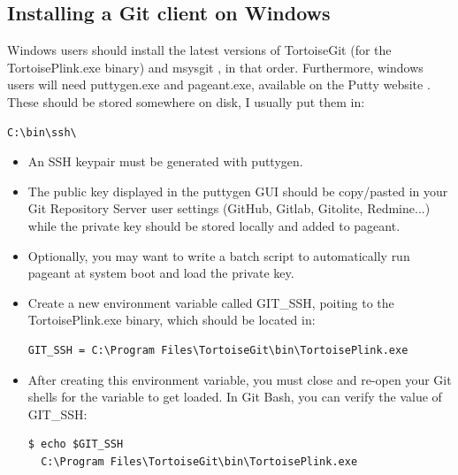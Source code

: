 \documentclass{../common/tufte-latex/tufte-handout}
\begin{document}
\subsection{Installing a Git client on Windows}\label{sec:preparation}

Windows users should install the latest versions of TortoiseGit  (for the TortoisePlink.exe binary) and msysgit , in that order.
Furthermore, windows users will need puttygen.exe and pageant.exe, available on the Putty website . These should be stored somewhere on disk, I usually put them in:

\begin{lstlisting}[style=BashInputStyle]
  C:\bin\ssh\
\end{lstlisting}

\begin{itemize}

\item{An SSH keypair must be generated with puttygen.}
\item{The public key displayed in the puttygen GUI should be copy/pasted in your Git Repository Server user settings (GitHub, Gitlab, Gitolite, Redmine...) while the private key should be stored locally and added to pageant.} 
\item{Optionally, you may want to write a batch script to automatically run pageant at system boot and load the private key.}
\item{Create a new environment variable called GIT\_SSH, poiting to the TortoisePlink.exe binary, which should be located in:}

\begin{lstlisting}[style=BashInputStyle]
  GIT_SSH = C:\Program Files\TortoiseGit\bin\TortoisePlink.exe
\end{lstlisting}

\item{After creating this environment variable, you must close and re-open your Git shells for the variable to get loaded. In Git Bash, you can verify the value of GIT\_SSH:}

\begin{lstlisting}[style=BashInputStyle]
  $ echo $GIT_SSH
  C:\Program Files\TortoiseGit\bin\TortoisePlink.exe
\end{lstlisting}

\end{itemize}
\end{document}
